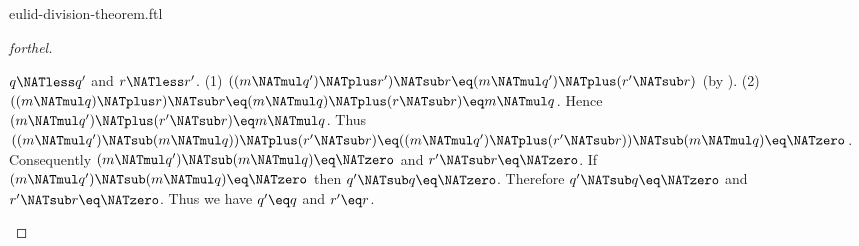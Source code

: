 \documentclass{stex}
\begin{document}
\begin{smodule}{eulid-division-theorem.ftl}
\begin{proof}[forthel]
  \begin{case}{$q \NATless q'$ and $r \NATless r'$.}
    (1) $((m \NATmul q') \NATplus r') \NATsub r \eq (m \NATmul q') \NATplus (r' \NATsub r)$ (by ).
    (2) $((m \NATmul q) \NATplus r) \NATsub r
      \eq (m \NATmul q) \NATplus (r \NATsub r)
      \eq m \NATmul q$.
    Hence $(m \NATmul q') \NATplus (r' \NATsub r) \eq m \NATmul q$.
    Thus $((m \NATmul q') \NATsub (m \NATmul q)) \NATplus (r' \NATsub r)
      \eq ((m \NATmul q') \NATplus (r' \NATsub r)) \NATsub (m \NATmul q)
      \eq \NATzero$.
    Consequently $(m \NATmul q') \NATsub (m \NATmul q) \eq \NATzero$ and $r' \NATsub r \eq \NATzero$.
    If $(m \NATmul q') \NATsub (m \NATmul q) \eq \NATzero$ then $q' \NATsub q \eq \NATzero$.
    Therefore $q' \NATsub q \eq \NATzero$ and $r' \NATsub r \eq \NATzero$.
    Thus we have $q' \eq q$ and $r' \eq r$.
  \end{case}
\end{proof}
\end{smodule}
\end{document}
